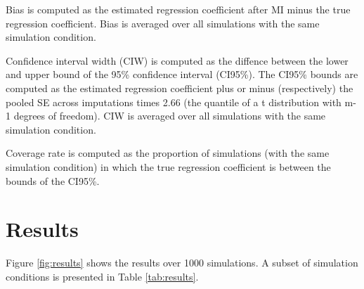 \documentclass[article]{jss}
\begin{document}


Bias is computed as the estimated regression coefficient after MI minus the true regression coefficient. Bias is averaged over all simulations with the same simulation condition.

Confidence interval width (CIW) is computed as the diffence between the lower and upper bound of the 95\% confidence interval (CI95\%). The CI95\% bounds are computed as the estimated regression coefficient plus or minus (respectively) the pooled SE across imputations times 2.66 (the quantile of a t distribution with m-1 degrees of freedom). CIW is averaged over all simulations with the same simulation condition.

Coverage rate is computed as the proportion of simulations (with the same simulation condition) in which the true regression coefficient is between the bounds of the CI95\%. 





\section{Results}

Figure \ref{fig:results} shows the results over 1000 simulations. A subset of simulation conditions is presented in Table \ref{tab:results}.
\end{document}
